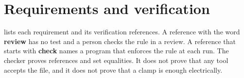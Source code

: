 \section{Requirements and verification}\label{ds:ch:power-intent:map}
 lists each requirement and its verification references. A reference with the word \textbf{review} has no test and a person checks the rule in a review. A reference that starts with \textbf{check} names a program that enforces the rule at each run. The checker proves references and set equalities. It does not prove that any tool accepts the file, and it does not prove that a clamp is enough electrically.


